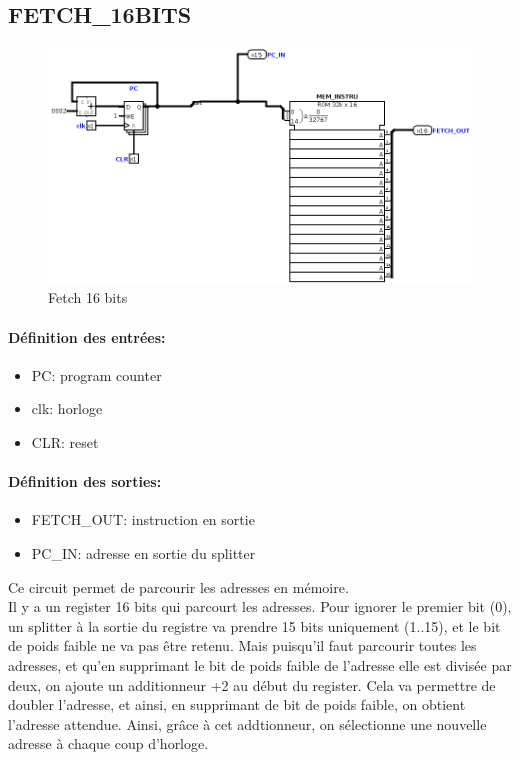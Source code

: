 \documentclass[a4paper]{article} %
\begin{document}
\subsection{FETCH\_16BITS}
\begin{figure}[H]
    \centering
    \includegraphics[width=1\textwidth]{src/FETCH.png}
    \caption{Fetch 16 bits}
    \label{fetch_16bits}
\end{figure}
\paragraph{Définition des entrées:}
\begin{itemize}
    \item     PC: program counter
    \item     clk: horloge
    \item     CLR: reset
\end{itemize}

\paragraph{Définition des sorties:}
\begin{itemize}
    \item FETCH\_OUT: instruction en sortie
    \item     PC\_IN: adresse en sortie du splitter
\end{itemize}
\medskip
Ce circuit permet de parcourir les adresses en mémoire. \\
Il y a un register 16 bits qui parcourt les adresses. Pour ignorer le premier bit (0), un splitter à la sortie du registre va prendre 15 bits uniquement (1..15), et le bit de poids faible ne va pas être retenu. Mais puisqu'il faut parcourir toutes les adresses, et qu'en supprimant le bit de poids faible de l'adresse elle est divisée par deux, on ajoute un additionneur +2 au début du register. Cela va permettre de doubler l'adresse, et ainsi, en supprimant de bit de poids faible, on obtient l'adresse attendue. Ainsi, grâce à cet addtionneur, on sélectionne une nouvelle adresse à chaque coup d'horloge.
\end{document}
